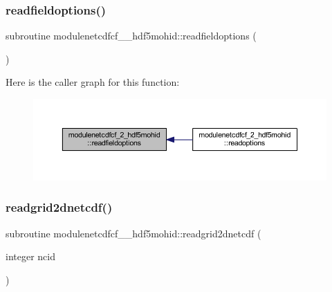 \mbox{\label{namespacemodulenetcdfcf__2__hdf5mohid_a21d2fbdc24da139bc76ad03220d11dc9}} 
\subsubsection{\texorpdfstring{readfieldoptions()}{readfieldoptions()}}
{\footnotesize\ttfamily subroutine modulenetcdfcf\+\_\+\_\+hdf5mohid\+::readfieldoptions (\begin{DoxyParamCaption}{ }\end{DoxyParamCaption})\hspace{0.3cm}{\ttfamily [private]}}

Here is the caller graph for this function\+:\nopagebreak
\begin{figure}[H]
\begin{center}
\leavevmode
\includegraphics[width=350pt]{namespacemodulenetcdfcf__2__hdf5mohid_a21d2fbdc24da139bc76ad03220d11dc9_icgraph}
\end{center}
\end{figure}
\mbox{\label{namespacemodulenetcdfcf__2__hdf5mohid_a551caefae44a438a2446fd263b4b51e7}} 
\subsubsection{\texorpdfstring{readgrid2dnetcdf()}{readgrid2dnetcdf()}}
{\footnotesize\ttfamily subroutine modulenetcdfcf\+\_\+\_\+hdf5mohid\+::readgrid2dnetcdf (\begin{DoxyParamCaption}\item[{integer}]{ncid }\end{DoxyParamCaption})\hspace{0.3cm}{\ttfamily [private]}}

